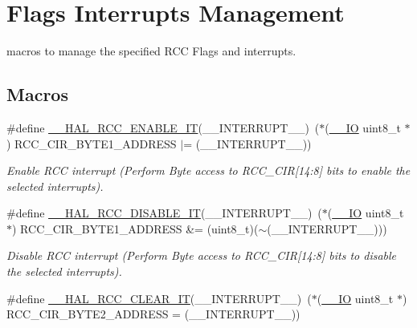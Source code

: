 \hypertarget{group___r_c_c___flags___interrupts___management}{}\section{Flags Interrupts Management}
\label{group___r_c_c___flags___interrupts___management}


macros to manage the specified R\+CC Flags and interrupts.  


\subsection*{Macros}
\begin{DoxyCompactItemize}
\item 
\#define \hyperlink{group___r_c_c___flags___interrupts___management_ga180fb20a37b31a6e4f7e59213a6c0405}{\+\_\+\+\_\+\+H\+A\+L\+\_\+\+R\+C\+C\+\_\+\+E\+N\+A\+B\+L\+E\+\_\+\+IT}(\+\_\+\+\_\+\+I\+N\+T\+E\+R\+R\+U\+P\+T\+\_\+\+\_\+)~($\ast$(\hyperlink{core__sc300_8h_aec43007d9998a0a0e01faede4133d6be}{\+\_\+\+\_\+\+IO} uint8\+\_\+t $\ast$) R\+C\+C\+\_\+\+C\+I\+R\+\_\+\+B\+Y\+T\+E1\+\_\+\+A\+D\+D\+R\+E\+SS $\vert$= (\+\_\+\+\_\+\+I\+N\+T\+E\+R\+R\+U\+P\+T\+\_\+\+\_\+))
\begin{DoxyCompactList}\small\item\em Enable R\+CC interrupt (Perform Byte access to R\+C\+C\+\_\+\+C\+IR\mbox{[}14\+:8\mbox{]} bits to enable the selected interrupts). \end{DoxyCompactList}\item 
\#define \hyperlink{group___r_c_c___flags___interrupts___management_gafc4df8cd4df0a529d11f18bf1f7e9f50}{\+\_\+\+\_\+\+H\+A\+L\+\_\+\+R\+C\+C\+\_\+\+D\+I\+S\+A\+B\+L\+E\+\_\+\+IT}(\+\_\+\+\_\+\+I\+N\+T\+E\+R\+R\+U\+P\+T\+\_\+\+\_\+)~($\ast$(\hyperlink{core__sc300_8h_aec43007d9998a0a0e01faede4133d6be}{\+\_\+\+\_\+\+IO} uint8\+\_\+t $\ast$) R\+C\+C\+\_\+\+C\+I\+R\+\_\+\+B\+Y\+T\+E1\+\_\+\+A\+D\+D\+R\+E\+SS \&= (uint8\+\_\+t)($\sim$(\+\_\+\+\_\+\+I\+N\+T\+E\+R\+R\+U\+P\+T\+\_\+\+\_\+)))
\begin{DoxyCompactList}\small\item\em Disable R\+CC interrupt (Perform Byte access to R\+C\+C\+\_\+\+C\+IR\mbox{[}14\+:8\mbox{]} bits to disable the selected interrupts). \end{DoxyCompactList}\item 
\#define \hyperlink{group___r_c_c___flags___interrupts___management_ga9d8ab157f58045b8daf8136bee54f139}{\+\_\+\+\_\+\+H\+A\+L\+\_\+\+R\+C\+C\+\_\+\+C\+L\+E\+A\+R\+\_\+\+IT}(\+\_\+\+\_\+\+I\+N\+T\+E\+R\+R\+U\+P\+T\+\_\+\+\_\+)~($\ast$(\hyperlink{core__sc300_8h_aec43007d9998a0a0e01faede4133d6be}{\+\_\+\+\_\+\+IO} uint8\+\_\+t $\ast$) R\+C\+C\+\_\+\+C\+I\+R\+\_\+\+B\+Y\+T\+E2\+\_\+\+A\+D\+D\+R\+E\+SS = (\+\_\+\+\_\+\+I\+N\+T\+E\+R\+R\+U\+P\+T\+\_\+\+\_\+))

\end{DoxyCompactItemize}
